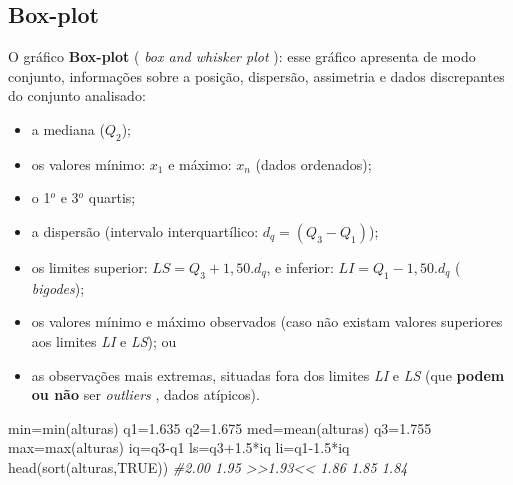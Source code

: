 \documentclass[
]{book}
\newenvironment{Shaded}{\begin{snugshade}}{\end{snugshade}}
\newcommand{\CommentTok}[1]{\textcolor[rgb]{0.56,0.35,0.01}{\textit{#1}}}
\newcommand{\ConstantTok}[1]{\textcolor[rgb]{0.00,0.00,0.00}{#1}}
\newcommand{\FloatTok}[1]{\textcolor[rgb]{0.00,0.00,0.81}{#1}}
\newcommand{\FunctionTok}[1]{\textcolor[rgb]{0.00,0.00,0.00}{#1}}
\newcommand{\NormalTok}[1]{#1}
\newcommand{\OtherTok}[1]{\textcolor[rgb]{0.56,0.35,0.01}{#1}}
\newcommand{\SpecialCharTok}[1]{\textcolor[rgb]{0.00,0.00,0.00}{#1}}
\providecommand{\tightlist}{%
  \setlength{\itemsep}{0pt}\setlength{\parskip}{0pt}}
\begin{document}
\hfill\break

\hypertarget{box-plot}{%
\subsection{Box-plot}\label{box-plot}}

\hfill\break

O gráfico \textbf{Box-plot} ( \emph{box and whisker plot} ): esse gráfico apresenta de modo conjunto, informações sobre a posição, dispersão, assimetria e dados discrepantes do conjunto analisado:

\hfill\break

\begin{itemize}
\tightlist
\item
  a mediana (\(Q_{2}\));
\item
  os valores mínimo: \(x_{1}\) e máximo: \(x_{n}\) (dados ordenados);
\item
  o 1\(^{o}\) e 3\(^{o}\) quartis;
\item
  a dispersão (intervalo interquartílico: \(d_{q}=(Q_{3} - Q_{1})\));
\item
  os limites superior: \(LS=Q_{3} + 1,50.d_{q}\), e inferior: \(LI=Q_{1} - 1,50.d_{q}\) ( \emph{bigodes});
\item
  os valores mínimo e máximo observados (caso não existam valores superiores aos limites \emph{LI} e \emph{LS}); ou
\item
  as observações mais extremas, situadas fora dos limites \emph{LI} e \emph{LS} (que \textbf{podem ou não} ser \emph{outliers} , dados atípicos).
\end{itemize}

\hfill\break

\begin{Shaded}
\begin{Highlighting}[]
\NormalTok{min}\OtherTok{=}\FunctionTok{min}\NormalTok{(alturas)}
\NormalTok{q1}\OtherTok{=}\FloatTok{1.635}
\NormalTok{q2}\OtherTok{=}\FloatTok{1.675}
\NormalTok{med}\OtherTok{=}\FunctionTok{mean}\NormalTok{(alturas)}
\NormalTok{q3}\OtherTok{=}\FloatTok{1.755}
\NormalTok{max}\OtherTok{=}\FunctionTok{max}\NormalTok{(alturas)}
\NormalTok{iq}\OtherTok{=}\NormalTok{q3}\SpecialCharTok{{-}}\NormalTok{q1}
\NormalTok{ls}\OtherTok{=}\NormalTok{q3}\FloatTok{+1.5}\SpecialCharTok{*}\NormalTok{iq}
\NormalTok{li}\OtherTok{=}\NormalTok{q1}\FloatTok{{-}1.5}\SpecialCharTok{*}\NormalTok{iq}
\FunctionTok{head}\NormalTok{(}\FunctionTok{sort}\NormalTok{(alturas,}\ConstantTok{TRUE}\NormalTok{)) }\CommentTok{\#2.00 1.95 \textgreater{}\textgreater{}1.93\textless{}\textless{} 1.86 1.85 1.84}
\end{Highlighting}
\end{Shaded}
\end{document}
